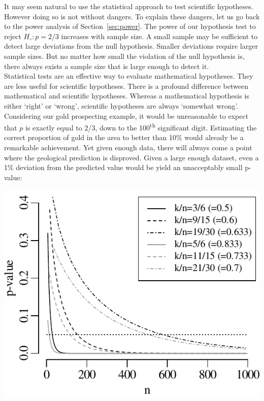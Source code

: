 It may seem natural to use the statistical approach to test scientific
hypotheses. However doing so is not without dangers. To explain these
dangers, let us go back to the power analysis of
Section~\ref{sec:power}. The power of our hypothesis test to reject
$H_\circ: p=2/3$ increases with sample size. A small sample may be
sufficient to detect large deviations from the null
hypothesis. Smaller deviations require larger sample sizes. But no
matter how small the violation of the null hypothesis is, there always
exists a sample size that is large enough to detect it.\\

Statistical tests are an effective way to evaluate mathematical
hypotheses. They are less useful for scientific hypotheses.  There is
a profound difference between mathematical and scientific
hypotheses. Whereas a mathematical hypothesis is either `right' or
`wrong', scientific hypotheses are always `somewhat wrong'.
Considering our gold prospecting example, it would be unreasonable to
expect that $p$ is exactly equal to 2/3, down to the
100\textsuperscript{th} significant digit.  Estimating the correct
proportion of gold in the area to better than 10\% would already be a
remarkable achievement. Yet given enough data, there will always come
a point where the geological prediction is disproved. Given a large
enough dataset, even a 1\% deviation from the predicted value would be
yield an unacceptably small p-value:

\noindent\begin{minipage}[t][][b]{.45\textwidth}
  \includegraphics[width=\textwidth]{../figures/binompvsn.pdf}
\end{minipage}
\begin{minipage}[t][][t]{.55\textwidth}
  \label{fig:binomnvsp}
\end{minipage}

